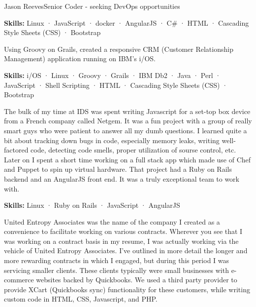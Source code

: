 \documentclass{article}
\begin{document}
\begin{cv}[avatar]{Jason Reeves}{Senior Coder - seeking DevOps opportunities}
\begin{cvevent}[Sep 2016][Sep 2017]
  \vspace*{3mm}
  \textbf{Skills:} Linux · JavaScript · docker · AngularJS · C\# · HTML · Cascading Style Sheets (CSS) · Bootstrap
  \vspace*{5mm}
\end{cvevent}

\begin{cvevent}[Jul 2013][Sep 2016]
  Using Groovy on Grails, created a responsive CRM (Customer Relationship Management) application running on IBM's i/OS.
  
  \vspace*{3mm}
  \textbf{Skills:} i/OS · Linux · Groovy · Grails · IBM Db2 · Java · Perl · JavaScript · Shell Scripting · HTML · Cascading Style Sheets (CSS) · Bootstrap
  \vspace*{5mm}
\end{cvevent}

\begin{cvevent}[Jul 2011][Oct 2015]
  The bulk of my time at IDS was spent writing Javascript for a set-top box device from a French company called Netgem. It was a fun project with a group of really smart guys who were patient to answer all my dumb questions. I learned quite a bit about tracking down bugs in code, especially memory leaks, writing well-factored code, detecting code smells, proper utilization of sourse control, etc. Later on I spent a short time working on a full stack app which made use of Chef and Puppet to spin up virtual hardware. That project had a Ruby on Rails backend and an AngularJS front end. It was a truly exceptional team to work with.  
  
  \vspace*{3mm}
  \textbf{Skills:} Linux · Ruby on Rails · JavaScript · AngularJS
  \vspace*{5mm}
\end{cvevent}

\begin{cvevent}[Feb 2009][Jul 2011]
  United Entropy Associates was the name of the company I created as a convenience to facilitate working on various contracts. Wherever you see that I was working on a contract basis in my resume, I was actually working via the vehicle of United Entropy Associates. I've outlined in more detail the longer and more rewarding contracts in which I engaged, but during this period I was servicing smaller clients. These clients typically were small businesses with e-commerce websites backed by Quickbooks. We used a third party provider to provide XCart (Quickbooks sync) functionality for these customers, while writing custom code in HTML, CSS, Javascript, and PHP.
  

\end{cvevent}
\end{cv}
\end{document}
